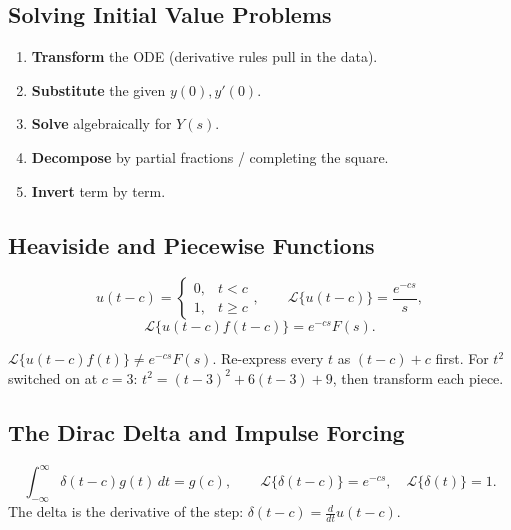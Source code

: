 \subsection{Solving Initial Value Problems}

\begin{methodbox}
\begin{enumerate}
    \item \textbf{Transform} the ODE (derivative rules pull in the data).
    \item \textbf{Substitute} the given $y(0), y'(0)$.
    \item \textbf{Solve} algebraically for $Y(s)$.
    \item \textbf{Decompose} by partial fractions / completing the square.
    \item \textbf{Invert} term by term.
\end{enumerate}
\end{methodbox}

\subsection{Heaviside and Piecewise Functions}

\begin{formulabox}
\[ u(t-c)=\begin{cases}0,&t<c\\1,&t\ge c\end{cases}, \qquad
   \mathcal{L}\{u(t-c)\}=\frac{e^{-cs}}{s}, \]
\[ \mathcal{L}\{u(t-c)f(t-c)\}=e^{-cs}F(s). \]
\end{formulabox}

\begin{warningbox}
$\mathcal{L}\{u(t-c)f(t)\}\ne e^{-cs}F(s)$. Re-express every $t$ as $(t-c)+c$ first.
For $t^2$ switched on at $c=3$: $t^2=(t-3)^2+6(t-3)+9$, then transform each piece.
\end{warningbox}

\subsection{The Dirac Delta and Impulse Forcing}

\begin{formulabox}
\[ \int_{-\infty}^{\infty}\delta(t-c)g(t)\,dt=g(c), \qquad
   \mathcal{L}\{\delta(t-c)\}=e^{-cs}, \quad \mathcal{L}\{\delta(t)\}=1. \]
The delta is the derivative of the step: $\delta(t-c)=\frac{d}{dt}u(t-c)$.
\end{formulabox}

